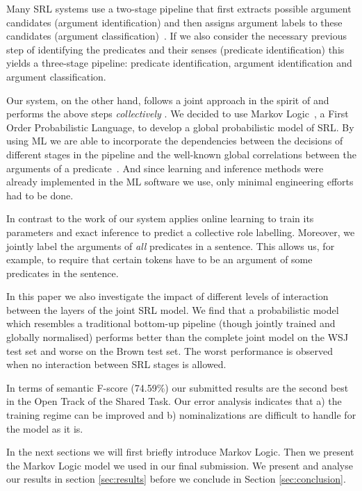 
 
Many SRL systems use a two-stage pipeline that first extracts possible argument candidates (argument identification) and then assigns argument labels to these candidates (argument classification)~\citep{xue04calibrating}. If we also consider the necessary previous step of identifying the predicates and their senses (predicate identification) this yields a three-stage pipeline: predicate identification, argument identification and argument classification. 

Our system, on the other hand, follows a joint approach in the spirit of \cite{toutanova05joint} and performs the above steps \emph{collectively} . We decided to use Markov Logic~\citep[ML,][]{richardson05markov}, a First Order Probabilistic Language, to develop a global probabilistic model of SRL. By using ML we are able to incorporate the dependencies between the decisions of different stages in the pipeline and the well-known global correlations between the arguments of a predicate~\citep{punyakanok05generalized}. And since learning and inference methods were already implemented in the ML software we use, only minimal engineering efforts had to be done.

In contrast to the work of \cite{toutanova05joint} our system applies online learning to train its parameters and exact inference to predict a collective role labelling. Moreover, we jointly label the arguments of \emph{all} predicates in a sentence. This allows us, for example, to require that certain tokens have to be an argument of some predicates in the sentence.  

In this paper we also investigate the impact of different levels of interaction between the layers of the joint SRL model. We find that a probabilistic model which resembles a traditional bottom-up pipeline (though jointly trained and globally normalised) performs better than the complete joint model on the WSJ test set and worse on the Brown test set. The worst performance is observed when no interaction between SRL stages is allowed.

In terms of semantic F-score (74.59\%) our submitted results are the second best in the Open Track of the Shared Task. Our error analysis indicates that a) the training regime can be improved and b) nominalizations are difficult to handle for the model as it is. 

In the next sections we will first briefly introduce Markov Logic. Then we present the Markov Logic model we used in our final submission. We present and analyse our results in section \ref{sec:results} before we conclude in Section \ref{sec:conclusion}.

